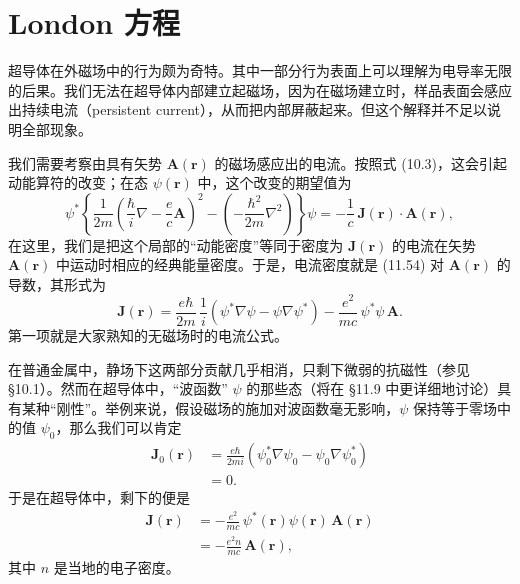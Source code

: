 \section{London 方程}

超导体在外磁场中的行为颇为奇特。其中一部分行为表面上可以理解为电导率无限的后果。我们无法在超导体内部建立起磁场，因为在磁场建立时，样品表面会感应出持续电流（persistent current），从而把内部屏蔽起来。但这个解释并不足以说明全部现象。

我们需要考察由具有矢势 $\mathbf{A}(\mathbf{r})$ 的磁场感应出的电流。按照式 (10.3)，这会引起动能算符的改变；在态 $\psi(\mathbf{r})$ 中，这个改变的期望值为
\begin{equation*}
\psi^{*}\left\{\frac{1}{2m}\left(\frac{\hbar}{i}\nabla - \frac{e}{c}\mathbf{A}\right)^{2} - \left(-\frac{\hbar^{2}}{2m}\nabla^{2}\right)\right\}\psi = -\frac{1}{c}\,\mathbf{J}(\mathbf{r})\cdot\mathbf{A}(\mathbf{r}), \tag{11.54}
\end{equation*}
在这里，我们是把这个局部的“动能密度”等同于密度为 $\mathbf{J}(\mathbf{r})$ 的电流在矢势 $\mathbf{A}(\mathbf{r})$ 中运动时相应的经典能量密度。于是，电流密度就是 (11.54) 对 $\mathbf{A}(\mathbf{r})$ 的导数，其形式为
\begin{equation*}
\mathbf{J}(\mathbf{r}) = \frac{e\hbar}{2m}\,\frac{1}{i}\left(\psi^{*}\nabla\psi - \psi\nabla\psi^{*}\right) - \frac{e^{2}}{mc}\,\psi^{*}\psi\,\mathbf{A}. \tag{11.55}
\end{equation*}
第一项就是大家熟知的无磁场时的电流公式。

在普通金属中，静场下这两部分贡献几乎相消，只剩下微弱的抗磁性（参见 §10.1）。然而在超导体中，“波函数” $\psi$ 的那些态（将在 §11.9 中更详细地讨论）具有某种“刚性”。举例来说，假设磁场的施加对波函数毫无影响，$\psi$ 保持等于零场中的值 $\psi_0$，那么我们可以肯定
\begin{align*}
\mathbf{J}_0(\mathbf{r}) &= \frac{e\hbar}{2mi}\left(\psi_0^{*}\nabla\psi_0 - \psi_0\nabla\psi_0^{*}\right)\\
&= 0. \tag{11.56}
\end{align*}
于是在超导体中，剩下的便是
\begin{align*}
\mathbf{J}(\mathbf{r}) &= -\frac{e^{2}}{mc}\,\psi^{*}(\mathbf{r})\psi(\mathbf{r})\,\mathbf{A}(\mathbf{r})\\
&= -\frac{e^{2}n}{mc}\,\mathbf{A}(\mathbf{r}), \tag{11.57}
\end{align*}
其中 $n$ 是当地的电子密度。

